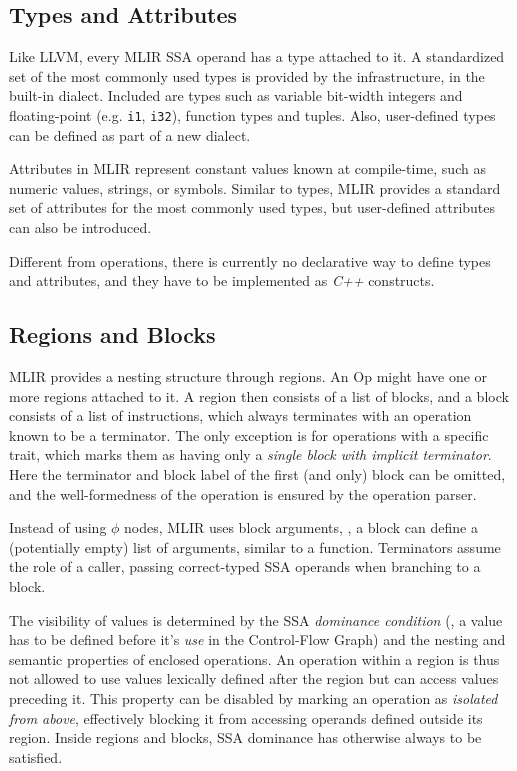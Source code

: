\subsection{Types and Attributes}
\label{sec:mlir_types}
Like LLVM, every MLIR SSA operand has a type attached to it. A standardized set of the most commonly used types is provided by the infrastructure, in the built-in dialect. Included are types such as variable bit-width integers and floating-point (e.g. \texttt{i1}, \texttt{i32}), function types and tuples. Also, user-defined types can be defined as part of a new dialect.

Attributes in MLIR represent constant values known at compile-time, such as numeric values, strings, or symbols. Similar to types, MLIR provides a standard set of attributes for the most commonly used types, but user-defined attributes can also be introduced.

Different from operations, there is currently no declarative way to define types and attributes, and they have to be implemented as \textit{C++} constructs.


\subsection{Regions and Blocks}
MLIR provides a nesting structure through regions. An Op might have one or more regions attached to it. A region then consists of a list of blocks, and a block consists of a list of instructions, which always terminates with an operation known to be a terminator. The only exception is for operations with a specific trait, which marks them as having only a \textit{single block with implicit terminator}. Here the terminator and block label of the first (and only) block can be omitted, and the well-formedness of the operation is ensured by the operation parser.

Instead of using $\phi$ nodes, MLIR uses block arguments, \ie, a block can define a (potentially empty) list of arguments, similar to a function. Terminators assume the role of a caller, passing correct-typed SSA operands when branching to a block.

The visibility of values is determined by the SSA \textit{dominance condition} (\ie, a value has to be defined before it's \textit{use} in the Control-Flow Graph) and the nesting and semantic properties of enclosed operations. An operation within a region is thus not allowed to use values lexically defined after the region but can access values preceding it. This property can be disabled by marking an operation as \textit{isolated from above}, effectively blocking it from accessing operands defined outside its region. Inside regions and blocks, SSA dominance has otherwise always to be satisfied.

